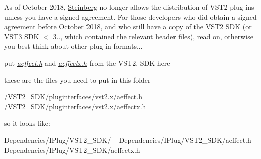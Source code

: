 As of October 2018, \mbox{\hyperlink{namespace_steinberg}{Steinberg}} no longer allows the distribution of V\+S\+T2 plug-\/ins unless you have a signed agreement. For those developers who did obtain a signed agreement before October 2018, and who still have a copy of the V\+S\+T2 S\+DK (or V\+S\+T3 S\+DK $<$ 3.., which contained the relevant header files), read on, otherwise you best think about other plug-\/in formats...

put {\itshape \mbox{\hyperlink{aeffect_8h_source}{aeffect.\+h}}} and {\itshape \mbox{\hyperlink{aeffectx_8h_source}{aeffectx.\+h}}} from the V\+S\+T2. S\+DK here

these are the files you need to put in this folder

{\ttfamily /\+V\+S\+T2\+\_\+\+S\+D\+K/pluginterfaces/vst2.\mbox{\hyperlink{aeffect_8h_source}{x/aeffect.\+h}}} ~\newline
 {\ttfamily /\+V\+S\+T2\+\_\+\+S\+D\+K/pluginterfaces/vst2.\mbox{\hyperlink{aeffectx_8h_source}{x/aeffectx.\+h}}} ~\newline


so it looks like\+:

{\ttfamily Dependencies/\+I\+Plug/\+V\+S\+T2\+\_\+\+S\+D\+K/} ~\newline
 {\ttfamily Dependencies/\+I\+Plug/\+V\+S\+T2\+\_\+\+S\+D\+K/aeffect.\+h} ~\newline
 {\ttfamily Dependencies/\+I\+Plug/\+V\+S\+T2\+\_\+\+S\+D\+K/aeffectx.\+h} ~\newline
 